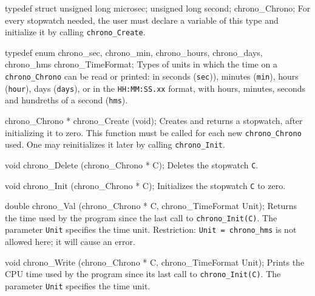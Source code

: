 \code
\iffalse
/* chrono.h for ANSI C */

#ifndef CHRONO_H
#define CHRONO_H
#include "TestU01/gdef.h"
\fi
\endcode

\newpage
\code

typedef struct {
   unsigned long microsec;
   unsigned long second;
   } chrono_Chrono;
\endcode
  \tab
   For every stopwatch needed, the user must declare a variable of
   this type and initialize it by calling {\tt chrono\_Create}.
  \endtab
\code


typedef enum {
   chrono_sec,
   chrono_min,
   chrono_hours,
   chrono_days,
   chrono_hms
   } chrono_TimeFormat;
\endcode
 \tab
  Types of units in which the time on a {\tt chrono\_Chrono} can be
  read or printed:
  in seconds ({\tt sec})), minutes ({\tt min}), hours ({\tt hour}), days
  ({\tt days}), or in the {\tt HH:MM:SS.xx} format, with hours,
  minutes, seconds and hundreths of a second ({\tt hms}).
 \endtab


\code

chrono_Chrono * chrono_Create (void);
\endcode
  \tab
   Creates and returns a stopwatch, after initializing it to zero. This
   function must be called for each new {\tt chrono\_Chrono} used.
   One may reinitializes it later by calling {\tt chrono\_Init}.
  \endtab
\code


void chrono_Delete (chrono_Chrono * C);
\endcode
  \tab
   Deletes the stopwatch {\tt C}.
  \endtab
\code


void chrono_Init (chrono_Chrono * C);
\endcode
  \tab
  Initializes the stopwatch {\tt C} to zero.
  \endtab
\code


double chrono_Val (chrono_Chrono * C, chrono_TimeFormat Unit);
\endcode
  \tab
  Returns the time used by the program since the last call to
  {\tt chrono\_Init(C)}. The parameter {\tt Unit} specifies the time unit.
  Restriction: {\tt Unit = chrono\_hms} is not allowed here;
  it will cause an error.
  \endtab
\code


void chrono_Write (chrono_Chrono * C, chrono_TimeFormat Unit);
\endcode
 \tab
  Prints the CPU time used by the program since its last
  call to {\tt chrono\_Init(C)}.
  The parameter {\tt Unit} specifies the time unit.
 \endtab
\code
\iffalse
#endif
\fi\endcode
